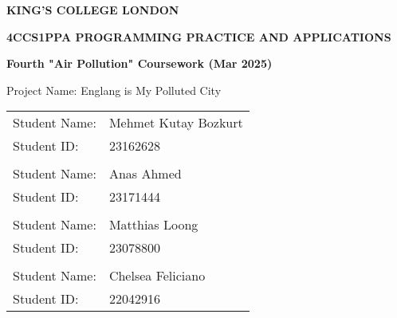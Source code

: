 \documentclass[10pt, a4paper]{scrartcl}
\begin{document}

    \begin{titlepage}
        \begin{center}
            \LARGE
            \textbf{KING'S COLLEGE LONDON}

            \vspace{2cm}

            \begin{adjustwidth}{-1cm}{-1cm}
                \centering
                \Large
                \textbf{4CCS1PPA PROGRAMMING PRACTICE AND APPLICATIONS}
            \end{adjustwidth}

            \vspace{0.5cm}

            \Large
            \textbf{Fourth "Air Pollution" Coursework (Mar 2025)}

            \vspace{2cm}

            \Large
            Project Name: Englang is My Polluted City

            \vspace{1cm}

            \Large
            \begin{tabular}{l l}
                Student Name: & Mehmet Kutay Bozkurt \\
                Student ID: & 23162628 \\
                \vspace{0.5cm} & \\
                Student Name: & Anas Ahmed \\
                Student ID: & 23171444 \\
                \vspace{0.5cm} & \\
                Student Name: & Matthias Loong \\
                Student ID: & 23078800 \\
                \vspace{0.5cm} & \\
                Student Name: & Chelsea Feliciano \\
                Student ID: & 22042916
            \end{tabular}
        \end{center}
    \end{titlepage}
\end{document}
